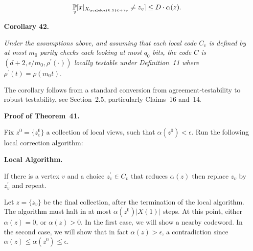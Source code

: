 \[\begin{gathered}
\operatorname*{\mathbb{P}}_{v}[x|_{{X}_{\scalebox{0.5}{+}v}}\neq z_{v}]\leq D\cdot\alpha(z).
\end{gathered}\]







\par\medskip\noindent\textbf{
\textbf{Corollary 42}\textbf{.}
}\par



\emph{Under the assumptions above, and assuming that each local code $C_{v}$ is defined by at most $m_{0}$ parity checks each looking at most $q_{0}$ bits, the code $C$ is $(d+2,\epsilon/m_{0},\rho^{\prime}(\cdot))$ locally testable under Definition 11 where $\rho^{\prime}(t)=\rho(m_{0}t)$.}\par






The corollary follows from a standard conversion from agreement-testability to robust testability, see Section 2.5, particularly Claims 16 and 14.\par




\par\medskip\noindent\textbf{Proof of Theorem 41.}\par




Fix $z^{0}=\{z^{0}_{v}\}$ a collection of local views, such that $\alpha(z^{0})<\epsilon$. Run the following local correction algorithm:\par





\par\medskip\noindent\textbf{Local Algorithm.}\par




If there is a vertex $v$ and a choice $z^{\prime}_{v}\in C_{v}$ that reduces $\alpha(z)$ then replace $z_{v}$ by $z^{\prime}_{v}$ and repeat.\par




Let $z=\{z_{v}\}$ be the final collection, after the termination of the local algorithm.
The algorithm must halt in at most $\alpha(z^{0})|X(1)|$ steps. At this point, either $\alpha(z)=0$, or $\alpha(z)>0$. In the first case, we will show a nearby codeword. In the second case, we will show that in fact $\alpha(z)>\epsilon$, a contradiction since $\alpha(z)\leq\alpha(z^{0})\leq\epsilon$.\par



